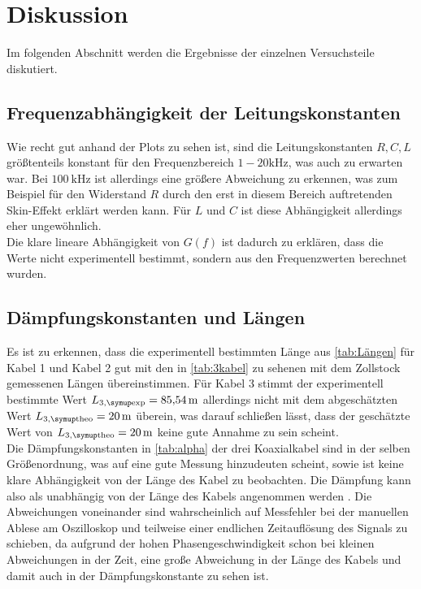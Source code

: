\section{Diskussion}
\label{sec:Diskussion}

Im folgenden Abschnitt werden die Ergebnisse der einzelnen Versuchsteile diskutiert.

\subsection{Frequenzabhängigkeit der Leitungskonstanten}

Wie recht gut anhand der Plots zu sehen ist, sind die Leitungskonstanten $R,C,L$ größtenteils konstant für den Frequenzbereich $1-20 \mathrm{kHz}$, was auch zu erwarten war. Bei $\qty{100}{\kilo\hertz}$ ist allerdings eine größere Abweichung zu erkennen, was zum Beispiel für den Widerstand $R$ durch den erst in diesem Bereich auftretenden Skin-Effekt erklärt werden kann. Für $L$ und $C$ ist diese Abhängigkeit allerdings eher ungewöhnlich. \\
Die klare lineare Abhängigkeit von $G(f)$ ist dadurch zu erklären, dass die Werte nicht experimentell bestimmt, sondern aus den Frequenzwerten berechnet wurden.

\subsection{Dämpfungskonstanten und Längen}

Es ist zu erkennen, dass die experimentell bestimmten Länge aus \autoref{tab:Längen} für Kabel 1 und Kabel 2 gut mit den in \autoref{tab:3kabel} zu sehenen mit dem Zollstock gemessenen Längen übereinstimmen. Für Kabel 3 stimmt der experimentell bestimmte Wert $L_{3, \T{exp}} = \qty{85.54}{\meter}$ allerdings nicht mit dem abgeschätzten Wert $L_{3, \T{theo}} = \qty{20}{\meter}$ überein, was darauf schließen lässt, dass der geschätzte Wert von $L_{3, \T{theo}} = \qty{20}{\meter}$ keine gute Annahme zu sein scheint. \\

Die Dämpfungskonstanten in \autoref{tab:alpha} der drei Koaxialkabel sind in der selben Größenordnung, was auf eine gute Messung hinzudeuten scheint, sowie ist keine klare Abhängigkeit von der Länge des Kabel zu beobachten. Die Dämpfung kann also  als unabhängig von der Länge des Kabels angenommen werden . Die Abweichungen voneinander sind wahrscheinlich auf Messfehler bei der manuellen Ablese am Oszilloskop und teilweise einer endlichen Zeitauflösung des Signals zu schieben, da aufgrund der hohen Phasengeschwindigkeit schon bei kleinen Abweichungen in der Zeit, eine große Abweichung in der Länge des Kabels und damit auch in der Dämpfungskonstante zu sehen ist. 

